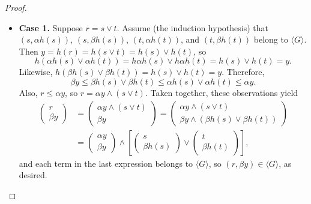 \begin{proof}
\begin{itemize}
  \item {\bf Case 1.} Suppose $r = s \vee t$. Assume (the induction hypothesis) 
  that $(s, \alpha {h(s)})$, $(s, \beta{h(s)})$, $(t, \alpha {h(t)})$, and 
  $(t, \beta{h(t)})$ belong to $\langle G \rangle$. Then 
  $y = h (r) = h(s\vee t) = h (s)\vee h(t)$, so 
  \[
  h(\alpha {h(s)} \vee \alpha {h(t)})= h\alpha h(s) \vee h\alpha h(t)=
  h(s) \vee h(t) = y.
  \]
  Likewise, $h(\beta{h(s)} \vee \beta {h(t)})= h(s) \vee h(t) = y$.
  Therefore, 
  \[
  \beta y \leqslant \beta h(s) \vee \beta h(t) \leqslant \alpha {h(s)} 
  \vee \alpha {h(t)} \leqslant \alpha y.
  \]
  Also, $r \leqslant \alpha y$, so $r = \alpha y \wedge (s\vee t)$.  Taken 
  together, these observations yield
  \begin{align}
    \left(\begin{array}{c} r \\ \beta y\end{array}\right) 
    &=\left(\begin{array}{c} 
              \alpha y \wedge (s\vee t) \\ 
              \beta y
            \end{array}
      \right) = 
      \left(\begin{array}{c} 
            \alpha y \wedge (s\vee t) \\ 
            \beta y \wedge (\beta {h(s)} \vee \beta {h(t)}) 
            \end{array}
      \right)\nonumber\\
    &=\left(\begin{array}{c} 
            \alpha y\\ 
            \beta y
            \end{array}
      \right) \wedge 
      \left[\left(\begin{array}{c}
                  s \\ 
                  \beta {h(s)}
                  \end{array}
            \right) \vee 
            \left(\begin{array}{c}
                  t \\ 
                  \beta {h(t)} 
                  \end{array}
            \right)
      \right], \nonumber
  \end{align}
  and each term in the last expression belongs to $\langle G \rangle$, 
  so $(r, \beta y) \in \langle G \rangle$, as desired.


\end{itemize}
\end{proof}

